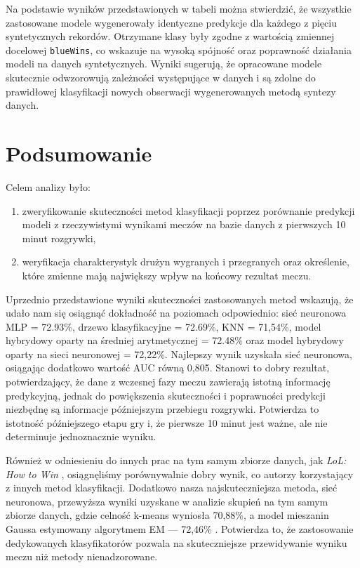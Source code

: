 \documentclass[twoside]{customStyle}
\newcommand{\getAccuracyKnn}{71,54}
\newcommand{\getAccuracyTree}{72.69}
\newcommand{\getAccuracyNn}{72.93}
\newcommand{\getAccuracyMixednn}{72,22}
\newcommand{\getaccuracyMixedsr}{72.48}
\newcommand{\getAucNn}{0,805}
\begin{document}
Na podstawie wyników przedstawionych w tabeli można stwierdzić, że wszystkie zastosowane modele wygenerowały identyczne predykcje dla każdego z pięciu syntetycznych rekordów. Otrzymane klasy były zgodne z wartością zmiennej docelowej \texttt{blueWins}, co wskazuje na wysoką spójność oraz poprawność działania modeli na danych syntetycznych. Wyniki sugerują, że opracowane modele skutecznie odwzorowują zależności występujące w danych i są zdolne do prawidłowej klasyfikacji nowych obserwacji wygenerowanych metodą syntezy danych.

\newpage
\section{Podsumowanie}

Celem analizy było:
\begin{enumerate}
\item zweryfikowanie skuteczności metod klasyfikacji poprzez porównanie predykcji modeli z rzeczywistymi wynikami meczów na bazie danych z pierwszych 10 minut rozgrywki,
\item weryfikacja charakterystyk drużyn wygranych i przegranych oraz określenie, które zmienne mają największy wpływ na końcowy rezultat meczu.
\end{enumerate}

Uprzednio przedstawione wyniki skuteczności zastosowanych metod wskazują, że udało nam się osiągnąć dokładność na poziomach odpowiednio: 
sieć neuronowa MLP = \getAccuracyNn\%, drzewo klasyfikacyjne = \getAccuracyTree\%, KNN = \getAccuracyKnn\%, model hybrydowy oparty na średniej arytmetycznej = \getaccuracyMixedsr\%
oraz model hybrydowy oparty na sieci neuronowej = \getAccuracyMixednn\%. Najlepszy wynik uzyskała sieć neuronowa, osiągając dodatkowo wartość AUC równą \getAucNn.
Stanowi to dobry rezultat, potwierdzający, że dane z wczesnej fazy meczu zawierają istotną informację predykcyjną, jednak do powiększenia skuteczności i poprawności predykcji niezbędnę są informacje późniejszym przebiegu rozgrywki. Potwierdza to istotność późniejszego etapu gry i, że pierwsze 10 minut jest ważne, ale nie determinuje jednoznacznie wyniku.

Również w odniesieniu do innych prac na tym samym zbiorze danych, jak \textit{LoL: How to Win} \cite{wang_lol_win}, osiągnęliśmy porównywalnie dobry wynik, co autorzy korzystający z innych metod klasyfikacji. Dodatkowo nasza najskuteczniejsza metoda, sieć neuronowa, przewyższa wyniki uzyskane w analizie skupień na tym samym zbiorze danych, gdzie celność k-means wyniosła 70,88\%, a model mieszanin Gaussa estymowany algorytmem EM --- 72,46\% \cite{projekt1}. Potwierdza to, że zastosowanie dedykowanych klasyfikatorów pozwala na skuteczniejsze przewidywanie wyniku meczu niż metody nienadzorowane.
\end{document}
